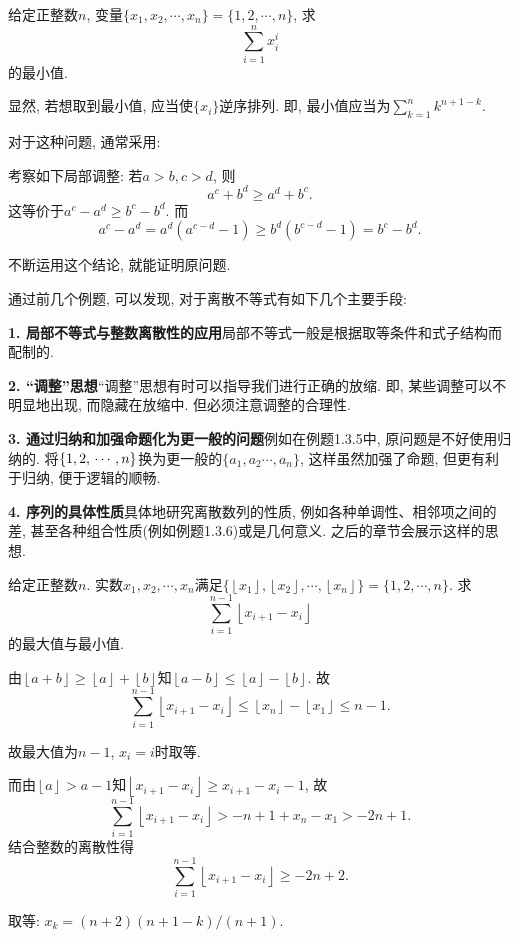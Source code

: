 \documentclass[lang=cn,12pt,thmcnt=section]{elegantbook}
\newcommand{\fl}[1]{\left\lfloor #1\right\rfloor}
\begin{document}
\begin{example}
给定正整数$n$, 变量$\{x_1,x_2,\cdots,x_n\}=\{1,2,\cdots,n\}$, 求
\[\sum_{i=1}^{n} x_i^i\]
的最小值.
\end{example}

\begin{analysis}
显然, 若想取到最小值, 应当使$\{x_i\}$逆序排列. 即, 最小值应当为$\sum_{k=1}^n k^{n+1-k}$. \par 
对于这种问题, 通常采用: 
\end{analysis}

\begin{solution}
考察如下局部调整: 若$a>b,c>d$, 则
\[a^c+b^d\ge a^d+b^c.\]
这等价于$a^c-a^d\ge b^c-b^d$. 而
\[a^c-a^d=a^d(a^{c-d}-1)\ge b^d(b^{c-d}-1)=b^c-b^d.\]\par
不断运用这个结论, 就能证明原问题.
\end{solution} 

通过前几个例题, 可以发现, 对于离散不等式有如下几个主要手段: \par 
\textbf{1. 局部不等式与整数离散性的应用}\quad 局部不等式一般是根据取等条件和式子结构而配制的. \par 
\textbf{2. “调整”思想}\quad “调整”思想有时可以指导我们进行正确的放缩. 即, 某些调整可以不明显地出现, 而隐藏在放缩中. 但必须注意调整的合理性.\par
\textbf{3. 通过归纳和加强命题化为更一般的问题}\quad 例如在例题1.3.5中, 原问题是不好使用归纳的. 将$\{1,2,\\ \cdots,n\}$换为更一般的$\{a_1,a_2\cdots,a_n\}$, 这样虽然加强了命题, 但更有利于归纳, 便于逻辑的顺畅.\par 
\textbf{4. 序列的具体性质}\quad 具体地研究离散数列的性质, 例如各种单调性、相邻项之间的差, 甚至各种组合性质(例如例题1.3.6)或是几何意义. 之后的章节会展示这样的思想.\par 

\begin{example}
给定正整数$n$. 实数$x_1,x_2,\cdots,x_n$满足$\{\fl{x_1},\fl{x_2},\cdots,\fl{x_n}\}=\{1,2,\cdots,n\}$. 求
\[\sum_{i=1}^{n-1}\fl{x_{i+1}-x_i}\]
的最大值与最小值.
\end{example}

\begin{solution}
由$\fl{a+b}\ge\fl{a}+\fl{b}$知$\fl{a-b}\le\fl{a}-\fl{b}$. 故
\[\sum_{i=1}^{n-1}\fl{x_{i+1}-x_i}\le \fl{x_n}-\fl{x_1}\le n-1.\]\par 
故最大值为$n-1$, $x_i=i$时取等.\par 
而由$\fl{a}>a-1$知$\fl{x_{i+1}-x_i}\ge x_{i+1}-x_i-1$, 故
\[\sum_{i=1}^{n-1}\fl{x_{i+1}-x_i}> -n+1+x_n-x_1> -2n+1.\]
结合整数的离散性得
\[\sum_{i=1}^{n-1}\fl{x_{i+1}-x_i}\ge -2n+2.\]\par
取等: $x_k=(n+2)(n+1-k)/(n+1).$
\end{solution}
\end{document}
